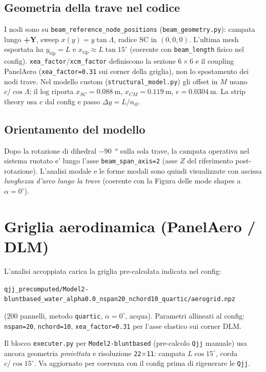 \documentclass[11pt,a4paper]{article}
\begin{document}
\subsection{Geometria della trave nel codice}

I nodi sono su \texttt{beam\_reference\_node\_positions} (\texttt{beam\_geometry.py}):
campata lungo \textbf{+Y}, sweep $x(y)=y\tan\Lambda$, radice SC in $(0,0,0)$.
L'ultima mesh esportata ha $y_\mathrm{tip}=L$ e $x_\mathrm{tip}\approx L\tan15^\circ$
(coerente con \texttt{beam\_length} fisico nel config).
\texttt{xea\_factor}/\texttt{xcm\_factor} definiscono la sezione $6\times6$ e il
coupling PanelAero (\texttt{xea\_factor=0.31} sui corner della griglia), non lo
spostamento dei nodi trave.
Nel modello custom (\texttt{structural\_model.py}) gli offset in $M$ usano
$c/\cos\Lambda$; il log riporta $x_{SC}=\SI{0.088}{\meter}$, $x_{CM}=\SI{0.119}{\meter}$,
$e=\SI{0.0304}{\meter}$.
La strip theory usa $c$ dal config e passo $\Delta y=L/n_\mathrm{el}$.

\subsection{Orientamento del modello}

Dopo la rotazione di dihedral \SI{-90}{\degree} sulla sola trave, la campata operativa
nel sistema ruotato e' lungo l'asse \texttt{beam\_span\_axis=2} (asse $Z$ del riferimento
post-rotazione). L'analisi modale e le forme modali sono quindi visualizzate con
ascissa \emph{lunghezza d'arco lungo la trave} (coerente con la Figura delle mode
shapes a $\alpha=0^\circ$).

\section{Griglia aerodinamica (PanelAero / DLM)}

L'analisi accoppiata carica la griglia pre-calcolata indicata nel config:
\begin{center}
\small
\texttt{qjj\_precomputed/Model2-bluntbased\_water\_alpha0.0\_nspan20\_nchord10\_quartic/aerogrid.npz}
\end{center}
(200 pannelli, metodo \texttt{quartic}, $\alpha=0^\circ$, acqua).
Parametri allineati al config: \texttt{nspan=20}, \texttt{nchord=10},
\texttt{xea\_factor=0.31} per l'asse elastico sui corner DLM.

Il blocco \texttt{executer.py} per \texttt{Model2-bluntbased} (pre-calcolo \texttt{Qjj}
manuale) usa ancora geometria \emph{proiettata} e risoluzione \texttt{22$\times$11}:
campata $L\cos15^\circ$, corda $c/\cos15^\circ$. Va aggiornato per coerenza con il config
prima di rigenerare le \texttt{Qjj}.
\end{document}
